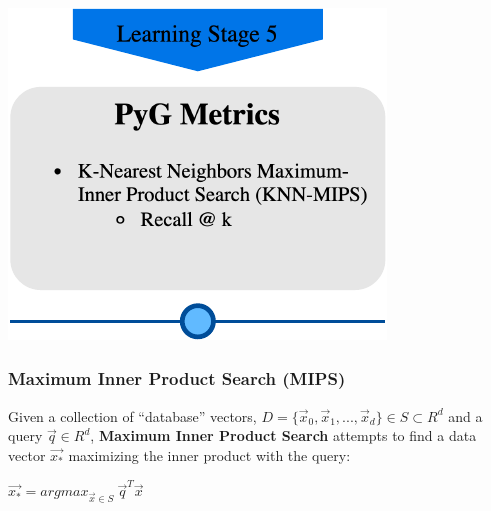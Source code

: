 \documentclass{beamer}
\begin{document}
\begin{frame}
\frametitle{}

\begin{minipage}[c]{0.8\textwidth}
    \hspace{1cm}
    \includegraphics[width=\linewidth]{GNN/imgs/LearningStage5.pdf}
\end{minipage}

\end{frame}


\begin{frame}[fragile]
\begin{itemize}
\frametitle{Maximum Inner Product Search (MIPS)}

\item Given a collection of “database” vectors, $D = \{\overrightarrow{x}_{0}, \overrightarrow{x}_{1}, ..., \overrightarrow{x}_{d} \} \in S \subset R^{d}$ and a query $\overrightarrow{q} \in R^{d}$, \textbf{Maximum Inner Product Search} attempts to find a data vector $\overrightarrow{x_{*}}$ maximizing the inner product with the query:

\begin{center}
    \item[] $\overrightarrow{x_{*}} = argmax_{\overrightarrow{x} \in S} \ \overrightarrow{q}^T \overrightarrow{x} $
\end{center}

\end{itemize}
\end{frame}
\end{document}
